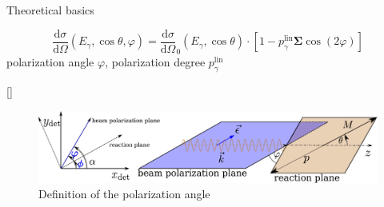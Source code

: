 \documentclass[11pt,aspectratio=169,dvipsnames]{beamer}
\newcommand{\thecolor}{black!70!blue}
\begin{document}
\begin{frame}{Theoretical basics}



		\begin{tcolorbox}[colback=blue!5,colframe=\thecolor,title=Beam asymmetry $\boldsymbol{\Sigma}$]
			$$\frac{\text{d}\sigma}{\text{d}\Omega}(E_\gamma,\cos\theta,\varphi)=\frac{\text{d}\sigma}{\text{d}\Omega}_0(E_\gamma,\cos\theta)\cdot\left[1-p_\gamma^{\text{lin}}\boldsymbol{\Sigma}\cos(2\varphi)\right]$$
		polarization angle $\varphi$, polarization degree $p_\gamma^{\text{lin}}$
			\begin{flushright}
				{}
			\end{flushright}
		\end{tcolorbox}

\begin{figure}
	\centering
	\includegraphics[width=.8\linewidth]{angles.pdf}
	\caption*{Definition of the polarization angle}
\end{figure}
\end{frame}
\end{document}

